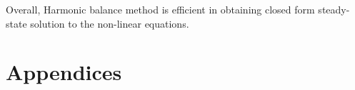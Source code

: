 \documentclass[12pt, a4paper]{extarticle}
\begin{document}
Overall, Harmonic balance method is efficient in obtaining closed form steady-state solution to the non-linear equations.

\newpage
\section{Appendices}

\newpage

\newpage

\newpage

\newpage

\newpage

\newpage

\newpage

\newpage


\end{document}
